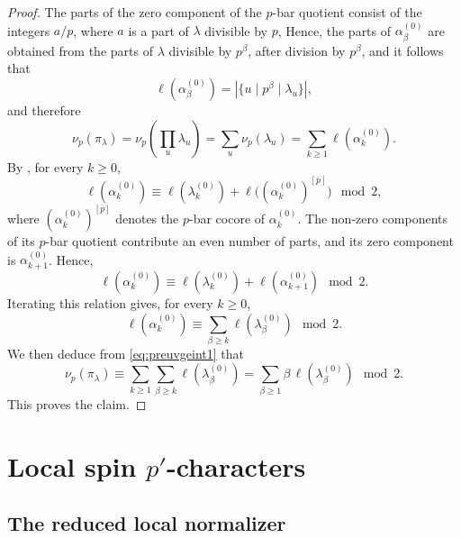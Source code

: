 \documentclass[reqno]{amsart}
\theoremstyle{definition}
\begin{document}
\begin{proof}
The parts of the zero component of the \(p\)-bar quotient consist of the
integers $a/p$, where $a$ is a part of $\lambda$ divisible by $p$, Hence, 
the parts of \(\alpha_\beta^{(0)}\) are obtained from the parts of \(\lambda\)
divisible by \(p^\beta\), after division by \(p^\beta\), and it follows that
\[
\ell(\alpha_\beta^{(0)})
=
|\{u\mid p^\beta\mid\lambda_u\}|,
\]
and therefore
\begin{equation}
\label{eq:preuvgeint1}
\nu_p\!(\pi_\lambda)=\nu_p\!\left(\prod_u\lambda_u\right)
=
\sum_u\nu_p(\lambda_u)
=
\sum_{k\geq1}\ell(\alpha_k^{(0)}).
\end{equation}
By \cite[Lemma 3.11]{BrNaMZ}, for every $k\geq0$,
\[
\ell(\alpha_k^{(0)})
\equiv
\ell(\lambda_k^{(0)})
+
\ell\bigl((\alpha_k^{(0)})^{[\bar p]}\bigr)
\mod2,
\]
where $(\alpha_k^{(0)})^{[\bar p]}$ denotes the $p$-bar cocore of
$\alpha_k^{(0)}$. The non-zero components of its $p$-bar quotient
contribute an even number of parts, and its zero component is
$\alpha_{k+1}^{(0)}$. Hence,
\[
\ell(\alpha_k^{(0)})
\equiv
\ell(\lambda_k^{(0)})
+
\ell(\alpha_{k+1}^{(0)})
\mod2.
\]
Iterating this relation gives, for every \(k\geq0\),
\begin{equation}
\label{eq:length-parity-tower}
\ell(\alpha_k^{(0)})
\equiv
\sum_{\beta\geq k}\ell(\lambda_\beta^{(0)})
\mod2.
\end{equation}
We then deduce from \eqref{eq:preuvgeint1} that
\[
\nu_p\!(\pi_\lambda)
\equiv
\sum_{k\geq1}\sum_{\beta\geq k}\ell(\lambda_\beta^{(0)})
=
\sum_{\beta \geq1} \beta\,\ell(\lambda_\beta^{(0)})
\mod2.
\]
This proves the claim.
\end{proof}

\section{Local spin \(p'\)-characters}
\label{sec:part2}

\subsection{The reduced local normalizer}
\end{document}
